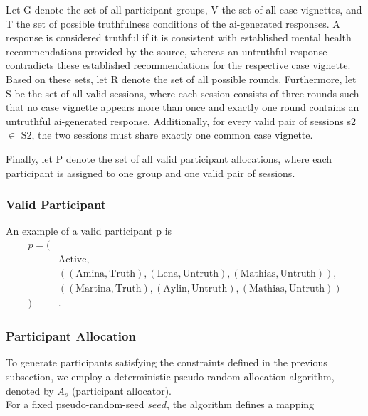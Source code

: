 \documentclass[sigconf,natbib=false]{acmart}
\begin{document}


Let \acrshort{G} denote the set of all participant groups, \acrshort{V} the set of all case vignettes, and \acrshort{T} the set of possible truthfulness conditions of the \Gls{ai}-generated responses. 
A response is considered truthful if it is consistent with established mental health recommendations provided by the source, whereas an untruthful response contradicts these established recommendations for the respective case vignette. 
Based on these sets, let \acrshort{R} denote the set of all possible rounds.
Furthermore, let \acrshort{S} be the set of all valid sessions, where each session consists of three rounds such that no case vignette appears more than once and exactly one round contains an untruthful \Gls{ai}-generated response. 
Additionally, for every valid pair of sessions \acrshort{s2} $\in$ \acrshort{S2}, the two sessions must share exactly one common case vignette.

Finally, let \acrshort{P} denote the set of all valid participant allocations, where each participant is assigned to one group and one valid pair of sessions.


\subsubsection{Valid Participant}
An example of a valid participant \acrshort{p} is
\begin{equation*}
\begin{aligned}
p = (&\\
&\mathrm{Active},\\
&((\mathrm{Amina},\mathrm{Truth}),
  (\mathrm{Lena},\mathrm{Untruth}),
  (\mathrm{Mathias},\mathrm{Untruth})),\\
&((\mathrm{Martina},\mathrm{Truth}),
  (\mathrm{Aylin},\mathrm{Untruth}),
  (\mathrm{Mathias},\mathrm{Untruth}))\\
)&.
\end{aligned}
\end{equation*}



\subsubsection{Participant Allocation}
\label{sec:participant-allocation}

To generate participants satisfying the constraints defined in the
previous subsection, we employ a deterministic pseudo-random allocation
algorithm, denoted by \(A_s\) (participant allocator).\\
For a fixed \gls{pseudo-random-seed} \({seed}\), the algorithm defines a mapping
\end{document}
